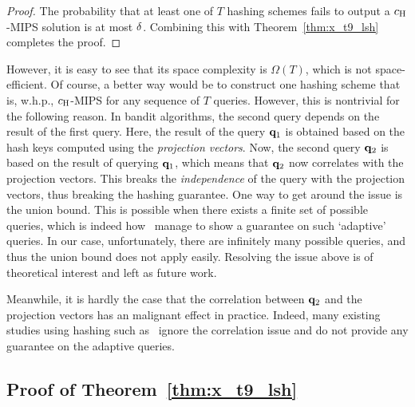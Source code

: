 \begin{proof}
  The probability that at least one of $T$ hashing schemes fails to output a $c_\text{\normalfont H}$-MIPS solution is at most ${\delta}$.
  Combining this with Theorem~\ref{thm:x_t9_lsh} completes the proof.
\end{proof}
However, it is easy to see that its space complexity is $\Omega(T)$, which is not space-efficient.
Of course, a better way would be to construct one hashing scheme that is, w.h.p., $c_\text{\normalfont H}$-MIPS for any sequence of $T$ queries.
However, this is nontrivial for the following reason.
In bandit algorithms, the second query depends on the result of the first query.
Here, the result of the query ${{\mathbf q}}_1$ is obtained based on the hash keys computed using the \emph{projection vectors}.
Now, the second query ${{\mathbf q}}_2$ is based on the result of querying ${{\mathbf q}}_1$, which means that ${{\mathbf q}}_2$ now correlates with the projection vectors.
This breaks the \emph{independence} of the query with the projection vectors, thus breaking the hashing guarantee.
One way to get around the issue is the union bound. 
This is possible when there exists a finite set of possible queries, which is indeed how~\cite{indyk12approximate} manage to show a guarantee on such `adaptive' queries.
In our case, unfortunately, there are infinitely many possible queries, and thus the union bound does not apply easily.
Resolving the issue above is of theoretical interest and left as future work.            

Meanwhile, it is hardly the case that the correlation between ${{\mathbf q}}_2$ and the projection vectors has an malignant effect in practice.
Indeed, many existing studies using hashing such as~\citet{jain10hashing} ignore the correlation issue and do not provide any guarantee on the adaptive queries.

\subsection{Proof of Theorem~\ref{thm:x_t9_lsh}}

